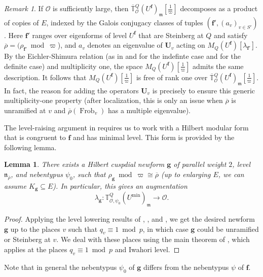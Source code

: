 \documentclass[a4paper, notitlepage, 10pt]{amsart}
\theoremstyle{plain} %
\newtheorem{lemma}[theorem]{Lemma}
\theoremstyle{definition} %
\theoremstyle{remark} %
\newtheorem{remark}[theorem]{Remark}
\numberwithin{equation}{section}
\newcommand{\bbT}{\mathbb T}
\newcommand{\Frob}{\operatorname{Frob}} %
\begin{document}
\begin{remark}\label{mult1overE}
    If $\mathcal{O}$ is sufficiently large, then $\overline{\bbT}{}^Q_{\mathcal{O}}(U^{\mathbf{f}})_{\mathfrak{m}}[\tfrac{1}{\varpi}]$ decomposes as a product of copies of $E$, indexed by the Galois conjugacy classes of tuples $(\mathbf{f}',(a_v)_{v\in S'})$. Here $\mathbf{f}'$ ranges over eigenforms of level $U^{\mathbf{f}}$ that are Steinberg at $Q$ and satisfy $\overline{\rho}=(\rho_{\mathbf{f}'}\bmod \varpi$), and $a_v$ denotes an eigenvalue of $\mathbf{U}_v$ acting on $M_Q(U^{\mathbf{f}})[\lambda_{\mathbf{f}'}]$. By the Eichler-Shimura relation (as in \cite[(2.3)]{Tho16} and \cite[\S 2.3]{Car} for the indefinte case and \cite[Lemma 1.3]{Tay06} for the definite case) and multiplicity one, the space $M_Q(U^{\mathbf{f}})[\tfrac{1}{\varpi}]$ admits the same description. It follows that $M_Q(U^{\mathbf{f}})[\tfrac{1}{\varpi}]$ is free of rank one over $\overline{\bbT}{}^Q_{\mathcal{O}}(U^{\mathbf{f}})_{\mathfrak{m}}[\tfrac{1}{\varpi}]$. In fact, the reason for adding the operators $\mathbf{U}_v$ is precisely to ensure this generic multiplicity-one property (after localization, this is only an issue when $\overline{\rho}$ is unramified at $v$ and  $\overline{\rho}(\Frob_v)$ has a multiple eigenvalue).
 \end{remark}


The level-raising argument in  requires us to work with a Hilbert modular form that is congruent to $\mathbf{f}$ and has minimal level. This form is provided by the following lemma.


\begin{lemma}\label{formg}
    There exists a Hilbert cuspdial newform $\mathbf{g}$ of parallel weight $2$, level $\mathfrak{n}_{\overline{\rho}}$, and nebentypus $\psi_0$,  such that $\rho_{\mathbf{g}}\bmod \varpi \cong \overline{\rho}$ (up to enlarging $E$, we can assume $K_{\mathbf{g}}\subseteq E$). In particular, this gives an augmentation
\begin{equation*}
    \lambda_{\mathbf{g}}\colon \mathbb{T}^{Q}_{\mathcal{O},\psi_{0}}(U^{\min})_{\mathfrak{m}}\longrightarrow \mathcal{O}. 
\end{equation*}
\end{lemma}
\begin{proof}
    Applying the level lowering results of \cite[Theorem 1.1]{Fuj1}, \cite{Jar99}, and \cite{Jar04}, we get the desired newform $\mathbf{g}$ up to the places $v$ such that $q_v\equiv 1 \bmod p$, in which case $\mathbf{g}$ could be unramified or Steinberg at $v$. We deal with these places using the main theorem of   \cite{Raj01}, which applies at the places $q_v\equiv 1 \bmod p$ and Iwahori level.
\end{proof}
Note that in general the nebentypus  $\psi_0$ of $\mathbf{g}$ differs from the nebentypus $\psi$ of $\mathbf{f}$. 
\end{document}
